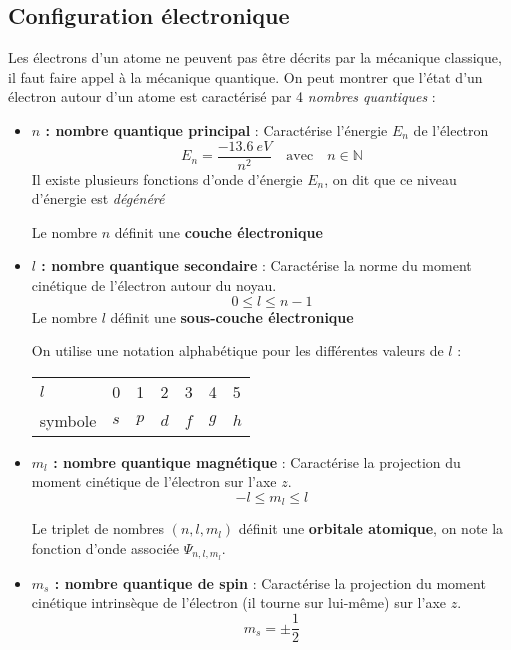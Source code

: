 \documentclass{cours}
\begin{document}
\subsection{Configuration électronique}%
\label{sub:configuration_electronique}

Les électrons d'un atome ne peuvent pas être décrits par la mécanique classique, il faut faire appel à la mécanique quantique. On peut montrer que l'état d'un électron autour d'un atome est caractérisé par 4 \textit{nombres quantiques} :

\begin{itemize}
	\item \textbf{$n$ : nombre quantique principal} : Caractérise l'énergie $E_n$
	      de l'électron
	      \begin{equation*}
		      E_n = \frac{\SI{-13.6}{eV}}{n^2} \quad \text{avec} \quad n\in\mathbb{N}
	      \end{equation*}
	      Il existe plusieurs fonctions d'onde d'énergie $E_n$, on dit que ce niveau
	      d'énergie est \emph{dégénéré}

	      Le nombre $n$ définit une \textbf{couche électronique}

	\item \textbf{$l$ : nombre quantique secondaire} : Caractérise la norme du
	      moment cinétique de l'électron autour du noyau.
	      \begin{equation*}
		      0 \leq l  \leq n-1
	      \end{equation*}
	      Le nombre $l$ définit une \textbf{sous-couche électronique}

	      On utilise une notation alphabétique pour les différentes valeurs de $l$ :

	      \begin{center}
		      \begin{tabular}{lllllll}
			      \toprule
			      $l$     & 0 & 1 & 2 & 3 & 4 & 5 \\
			      symbole & $s$ & $p$ & $d$ & $f$ & $g$ & $h$ \\
			      \bottomrule
		      \end{tabular}
	      \end{center}

	\item \textbf{$m_l$ : nombre quantique magnétique} : Caractérise la
	      projection du moment cinétique de l'électron sur l'axe $z$.
	      \begin{equation*}
		      -l \leq m_l \leq l
	      \end{equation*}


	      Le triplet de nombres $(n,l,m_l)$ définit une \textbf{orbitale atomique}, on
	      note la fonction d'onde associée $\Psi_{n, l, m_l}$.

	\item \textbf{$m_s$ : nombre quantique de spin} : Caractérise la projection
	      du moment cinétique intrinsèque de l'électron (il \og tourne \fg sur lui-même)
	      sur l'axe $z$.
	      \begin{equation*}
		      m_s = \pm \frac{1}{2}
	      \end{equation*}
\end{itemize}
\end{document}
